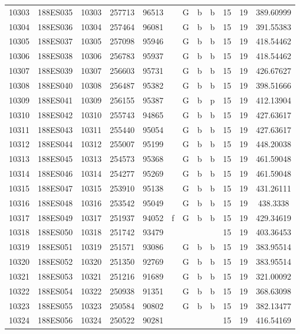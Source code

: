 \begin{tabular}{|*{12}{c|}}
10303 & 188ES035 & 10303 & 257713 & 96513 &  & G & b & b & 15 & 19 & 389.60999 \\ 
10304 & 188ES036 & 10304 & 257464 & 96081 &  & G & b & b & 15 & 19 & 391.55383 \\ 
10305 & 188ES037 & 10305 & 257098 & 95946 &  & G & b & b & 15 & 19 & 418.54462 \\ 
10306 & 188ES038 & 10306 & 256783 & 95937 &  & G & b & b & 15 & 19 & 418.54462 \\ 
10307 & 188ES039 & 10307 & 256603 & 95731 &  & G & b & b & 15 & 19 & 426.67627 \\ 
10308 & 188ES040 & 10308 & 256487 & 95382 &  & G & b & b & 15 & 19 & 398.51666 \\ 
10309 & 188ES041 & 10309 & 256155 & 95387 &  & G & b & p & 15 & 19 & 412.13904 \\ 
10310 & 188ES042 & 10310 & 255743 & 94865 &  & G & b & b & 15 & 19 & 427.63617 \\ 
10311 & 188ES043 & 10311 & 255440 & 95054 &  & G & b & b & 15 & 19 & 427.63617 \\ 
10312 & 188ES044 & 10312 & 255007 & 95199 &  & G & b & b & 15 & 19 & 448.20038 \\ 
10313 & 188ES045 & 10313 & 254573 & 95368 &  & G & b & b & 15 & 19 & 461.59048 \\ 
10314 & 188ES046 & 10314 & 254277 & 95269 &  & G & b & b & 15 & 19 & 461.59048 \\ 
10315 & 188ES047 & 10315 & 253910 & 95138 &  & G & b & b & 15 & 19 & 431.26111 \\ 
10316 & 188ES048 & 10316 & 253542 & 95049 &  & G & b & b & 15 & 19 & 438.3338 \\ 
10317 & 188ES049 & 10317 & 251937 & 94052 & f & G & b & b & 15 & 19 & 429.34619 \\ 
10318 & 188ES050 & 10318 & 251742 & 93479 &  &  &  &  & 15 & 19 & 403.36453 \\ 
10319 & 188ES051 & 10319 & 251571 & 93086 &  & G & b & b & 15 & 19 & 383.95514 \\ 
10320 & 188ES052 & 10320 & 251350 & 92769 &  & G & b & b & 15 & 19 & 383.95514 \\ 
10321 & 188ES053 & 10321 & 251216 & 91689 &  & G & b & b & 15 & 19 & 321.00092 \\ 
10322 & 188ES054 & 10322 & 250938 & 91351 &  & G & b & b & 15 & 19 & 368.63098 \\ 
10323 & 188ES055 & 10323 & 250584 & 90802 &  & G & b & b & 15 & 19 & 382.13477 \\ 
10324 & 188ES056 & 10324 & 250522 & 90281 &  &  &  &  & 15 & 19 & 416.54169 \\ 

\end{tabular}
